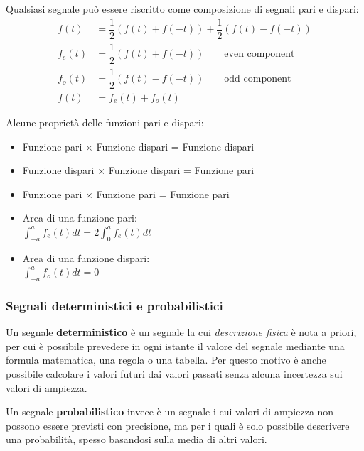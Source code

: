 \documentclass[a4paper, titlepage]{article}
\begin{document}
Qualsiasi segnale può essere riscritto come composizione di segnali pari e dispari:
\begin{align*}
	f(t)&=\dfrac{1}{2}(f(t)+f(-t))+\dfrac{1}{2}(f(t)-f(-t)) \\
	f_{e}(t)&=\dfrac{1}{2}(f(t)+f(-t)) \qquad \text{even component} \\
	f_{o}(t)&=\dfrac{1}{2}(f(t)-f(-t)) \qquad \text{odd component} \\
	f(t)&=f_{e}(t)+f_{o}(t)
\end{align*}

Alcune proprietà delle funzioni pari e dispari:
\begin{itemize}
	\item Funzione pari $\times$ Funzione dispari = Funzione dispari
	\item Funzione dispari $\times$ Funzione dispari = Funzione pari
	\item Funzione pari $\times$ Funzione pari = Funzione pari
	\item Area di una funzione pari:\\
	$\int_{-a}^{a} f_{e}(t) dt = 2\int_{0}^{a} f_{e}(t) dt$
	\item Area di una funzione dispari:\\
	$\int_{-a}^{a} f_{o}(t) dt = 0$
\end{itemize}

\subsubsection{Segnali deterministici e probabilistici}
Un segnale \textbf{deterministico} è un segnale la cui \textit{descrizione fisica} è nota a priori, per cui è possibile prevedere in ogni istante il valore del segnale mediante una formula matematica,
una regola o una tabella.
Per questo motivo è anche possibile calcolare i valori futuri dai valori passati senza alcuna incertezza sui valori di ampiezza.

\begin{center}
\end{center}

Un segnale \textbf{probabilistico} invece è un segnale i cui valori di ampiezza non possono essere previsti con precisione, ma per i quali è solo possibile descrivere una probabilità, spesso basandosi
sulla media di altri valori.
\end{document}

